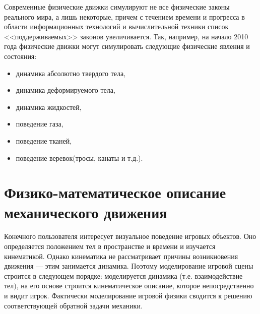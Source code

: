 Современные физические движки симулируют не все физические законы реального мира, а лишь некоторые,
причем с течением времени и прогресса в области информационных технологий и вычислительной техники
список <<поддерживаемых>> законов увеличивается. Так, например, на начало 2010 года физические движки 
могут симулировать следующие физические явления и состояния:
\begin{itemize}
  \item динамика абсолютно твердого тела,
  \item динамика деформируемого тела,
  \item динамика жидкостей,
  \item поведение газа, 
  \item поведение тканей,
  \item поведение веревок(тросы, канаты и т.д.).
\end{itemize}


\section{Физико-математическое описание механического движения}
Конечного пользователя интересует визуальное поведение игровых объектов.
Оно определяется положением тел в пространстве и времени и изучается кинематикой. Однако
кинематика не рассматривает причины возникновения движения --- этим занимается динамика. Поэтому
моделирование игровой сцены строится в следующем порядке: моделируется динамика (т.е. взаимодействие тел), на
его основе строится кинематическое описание, которое непосредственно и видит игрок. Фактически
моделирование игровой физики сводится к решению соответствующей обратной задачи механики.




